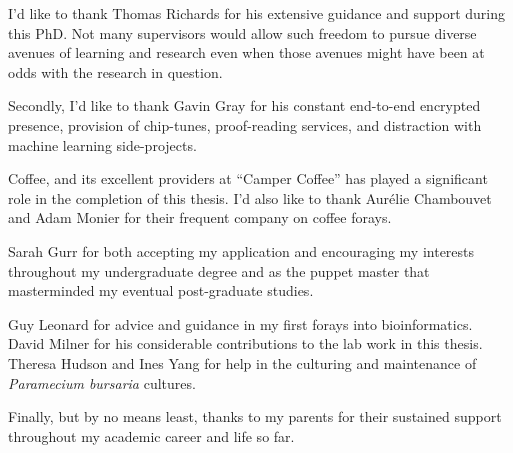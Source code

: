 
I'd like to thank Thomas Richards for his extensive guidance and support 
during this PhD. Not many supervisors
would allow such freedom to pursue diverse avenues of learning and
research even when those avenues might have been at odds with the research 
in question.

Secondly, I'd like to thank Gavin Gray 
for his constant end-to-end encrypted presence, provision of chip-tunes,
proof-reading services, and distraction with machine learning side-projects.  

Coffee, and its excellent providers at ``Camper Coffee''
has played a significant role in the completion of this thesis.
I'd also like to thank Aur\'elie Chambouvet and Adam Monier for their
frequent company on coffee forays. 

Sarah Gurr for both accepting my application and encouraging
my interests throughout my undergraduate degree and as the puppet master that 
masterminded my eventual post-graduate studies.

Guy Leonard for advice and guidance in my first forays into bioinformatics. 
David Milner for his considerable contributions to the lab work in this thesis.
Theresa Hudson and Ines Yang for help in the culturing and maintenance of 
\textit{Paramecium bursaria} cultures. 

Finally, but by no means least, thanks to my parents for their sustained
support throughout my academic career and life so far.  
